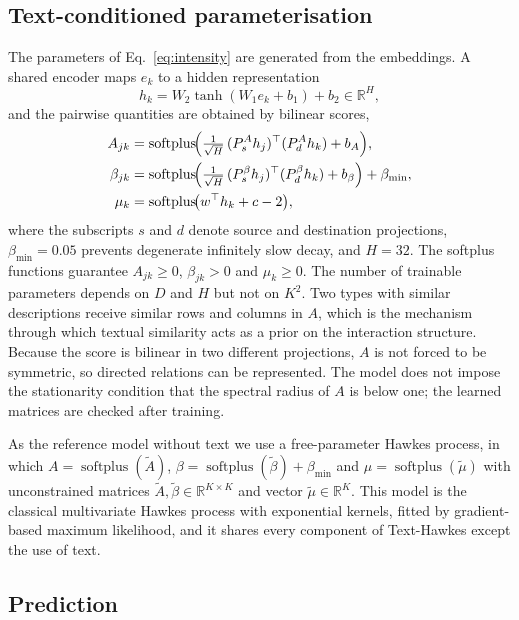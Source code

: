 \documentclass[preprint,12pt,authoryear]{elsarticle}
\newcommand{\softplus}{\operatorname{softplus}}
\begin{document}
\subsection{Text-conditioned parameterisation}

The parameters of Eq.~\eqref{eq:intensity} are generated from the embeddings. A shared encoder maps $e_k$ to a hidden representation
\begin{equation}
h_k=W_2\tanh(W_1e_k+b_1)+b_2\in\mathbb{R}^{H},
\end{equation}
and the pairwise quantities are obtained by bilinear scores,
\begin{align}
A_{jk}&=\softplus\!\Bigl(\tfrac{1}{\sqrt{H}}\,(P^{A}_{s}h_j)^{\top}(P^{A}_{d}h_k)+b_A\Bigr),\\
\beta_{jk}&=\softplus\!\Bigl(\tfrac{1}{\sqrt{H}}\,(P^{\beta}_{s}h_j)^{\top}(P^{\beta}_{d}h_k)+b_\beta\Bigr)+\beta_{\min},\\
\mu_k&=\softplus\!\bigl(w^{\top}h_k+c-2\bigr),
\end{align}
where the subscripts $s$ and $d$ denote source and destination projections, $\beta_{\min}=0.05$ prevents degenerate infinitely slow decay, and $H=32$. The softplus functions guarantee $A_{jk}\ge0$, $\beta_{jk}>0$ and $\mu_k\ge0$. The number of trainable parameters depends on $D$ and $H$ but not on $K^2$. Two types with similar descriptions receive similar rows and columns in $A$, which is the mechanism through which textual similarity acts as a prior on the interaction structure. Because the score is bilinear in two different projections, $A$ is not forced to be symmetric, so directed relations can be represented. The model does not impose the stationarity condition that the spectral radius of $A$ is below one; the learned matrices are checked after training.

As the reference model without text we use a free-parameter Hawkes process, in which $A=\softplus(\tilde A)$, $\beta=\softplus(\tilde\beta)+\beta_{\min}$ and $\mu=\softplus(\tilde\mu)$ with unconstrained matrices $\tilde A,\tilde\beta\in\mathbb{R}^{K\times K}$ and vector $\tilde\mu\in\mathbb{R}^{K}$. This model is the classical multivariate Hawkes process with exponential kernels, fitted by gradient-based maximum likelihood, and it shares every component of Text-Hawkes except the use of text.

\subsection{Prediction}
\end{document}
